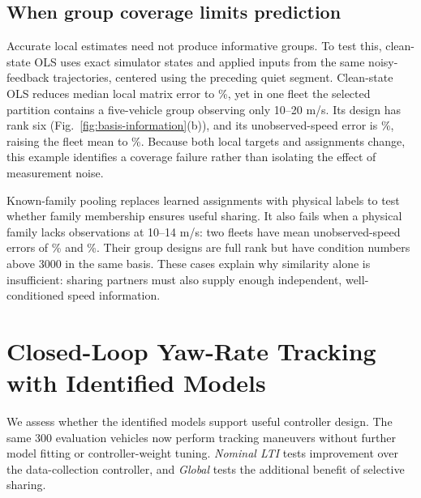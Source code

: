 \documentclass[conference]{IEEEtran}
\newcommand{\rev}[1]{\textcolor{revisiongreen}{#1}}
\newcommand{\revred}[1]{\textcolor{revisionred}{#1}}
\newcommand{\method}[1]{\textit{#1}}
\newcommand{\GlobalModel}{\method{Global}}
\newcommand{\NominalLTI}{\method{Nominal LTI}}
\begin{document}
\subsection{\rev{When group coverage limits prediction}}
\rev{Accurate} local \rev{estimates need} not \rev{produce informative groups}.
\revred{To test this, clean-state OLS uses exact simulator states and applied inputs
from the same noisy-feedback trajectories, centered using the preceding quiet segment.}
Clean-state OLS reduces median local matrix error to \OECleanLocalMedian\%,
yet \rev{in} one fleet \rev{the selected partition contains} a \rev{five-vehicle} group
\rev{observing} only 10--20 m/s. \rev{Its design} has rank six
(Fig.~\ref{fig:basis-information}(b)), \rev{and its} unobserved-speed error is
\OEDeficientGroupUnseen\%, raising the fleet mean to \OECleanFailureUnseen\%.
Because \rev{both local} targets and assignments change, this \rev{example identifies}
a coverage failure \rev{rather than} isolating the effect of measurement noise.

\revred{Known-family pooling replaces learned assignments with physical labels to
test whether family membership ensures useful sharing. It} \rev{also fails} when a physical family lacks observations
at 10--14 m/s: \rev{two fleets have mean unobserved-speed} errors of
\OEFamilyWorst\% and \OEFamilySecondWorst\%. \rev{Their group} designs \rev{are} full
rank but have condition numbers above 3000 \rev{in the same basis.
These cases explain why} similarity \rev{alone is insufficient: sharing partners
must also} supply \rev{enough independent}, well-conditioned \rev{speed information}.
\endgroup

\newcommand{\TransientCaptionRevision}[1]{#1}


\section{\rev{Closed-Loop Yaw-Rate Tracking with Identified Models}}
\begingroup
\rev{We assess whether the identified models support useful controller} design.
\rev{The same 300 evaluation vehicles now perform} tracking \rev{maneuvers} without
\rev{further model fitting or controller-weight tuning}. \NominalLTI{} tests
improvement over the \rev{data-collection} controller, \rev{and} \GlobalModel{} tests
\rev{the additional benefit of} selective sharing.
\end{document}
